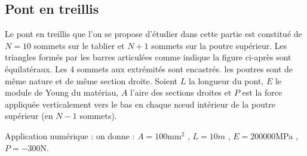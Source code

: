 \documentclass[11pt]{article}
\begin{document}
\subsection*{Pont en treillis}
Le pont en treillis que l'on se propose d'étudier dans cette partie est constitué de $N=10$ sommets sur le tablier et $N+1$ sommets sur la poutre supérieur. Les triangles formés par les barres articulées comme indique la figure ci-après sont équilatéraux. Les 4 sommets aux extrémités sont encastrés. les poutres sont de même nature et de même section droite.
Soient $L$ la longueur du pont, $E$ le module de Young du matériau, $A$ l'aire des sections droites et $P$ est la force appliquée verticalement vers le bas en chaque nœud intérieur de la poutre supérieur (en $N-1$ sommets).

 Application numérique : on donne :
$A=100\mbox{mm}^2$ , $L=10 m$ , $E=200000$MPa , $P =-300$N. 
\end{document}
